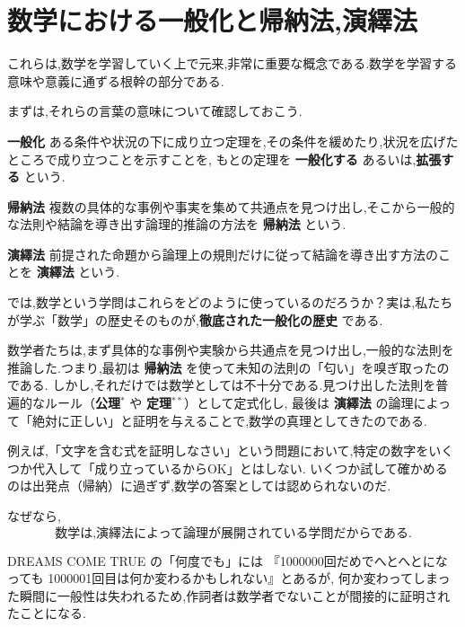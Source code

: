 \enlargethispage{2.5\baselineskip}
\section{数学における一般化と帰納法,演繹法}

これらは,数学を学習していく上で元来,非常に重要な概念である.数学を学習する意味や意義に通ずる根幹の部分である.

まずは,それらの言葉の意味について確認しておこう.

\begin{definitionbox}{\textbf{一般化}}
  ある条件や状況の下に成り立つ定理を,その条件を緩めたり,状況を広げたところで成り立つことを示すことを,
  もとの定理を \textbf{一般化する} あるいは,\textbf{拡張する} という.
\end{definitionbox}

\begin{definitionbox}{\textbf{帰納法}}
  複数の具体的な事例や事実を集めて共通点を見つけ出し,そこから一般的な法則や結論を導き出す論理的推論の方法を \textbf{帰納法} という.
\end{definitionbox}

\begin{definitionbox}{\textbf{演繹法}}
  前提された命題から論理上の規則だけに従って結論を導き出す方法のことを \textbf{演繹法} という.
\end{definitionbox}

では,数学という学問はこれらをどのように使っているのだろうか？実は,私たちが学ぶ「数学」の歴史そのものが,\textbf{徹底された一般化の歴史} である.

数学者たちは,まず具体的な事例や実験から共通点を見つけ出し,一般的な法則を推論した.つまり,最初は \textbf{帰納法} を使って未知の法則の「匂い」を嗅ぎ取ったのである.
しかし,それだけでは数学としては不十分である.見つけ出した法則を普遍的なルール（\textbf{公理}$^{*}$ や \textbf{定理}$^{**}$）として定式化し,
最後は \textbf{演繹法} の論理によって「絶対に正しい」と証明を与えることで,数学の真理としてきたのである.

例えば,「文字を含む式を証明しなさい」という問題において,特定の数字をいくつか代入して「成り立っているからOK」とはしない.
いくつか試して確かめるのは出発点（帰納）に過ぎず,数学の答案としては認められないのだ.

なぜなら,
\[\text{数学は,} \textbf{演繹法によって論理が展開されている学問}\text{だからである.}\]

DREAMS COME TRUE の「何度でも」には 『1000000回だめでへとへとになっても 1000001回目は何か変わるかもしれない』とあるが,
何か変わってしまった瞬間に一般性は失われるため,作詞者は数学者でないことが間接的に証明されたことになる.

